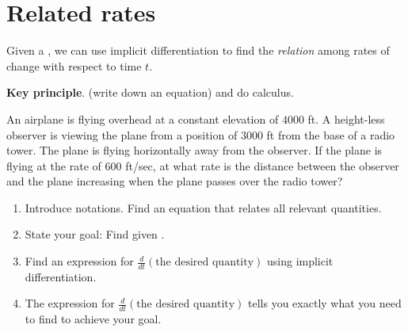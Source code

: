 \documentclass[../main.tex]{subfiles}
\begin{document}
 \section{Related rates} \label{lesson:related-rates}
Given a , we can use implicit differentiation  to find the \emph{relation} among rates of change with respect to time \(t\). 

\begin{mdframed}[style=simple-compact]
  \textbf{Key principle}.  (write down an equation) and do calculus. 
\end{mdframed}

\begin{example} \label{ex:related-rates-plane}
  An airplane is flying overhead at a constant elevation of \(4000\) ft. A height-less observer is viewing the plane from a position of \(3000\) ft from the base of a radio tower. The plane is flying horizontally away from the observer. If the plane is flying at the rate of \(600\) ft/sec, at what rate is the distance between the observer and the plane increasing when the plane passes over the radio tower?

  \begin{enumerate}[wide, label=(Step~\arabic*).]
    \item Introduce notations. Find an equation that relates all relevant quantities.


    \item State your goal: Find \underline{\hspace{1in}} given \underline{\hspace{3in}}.

    \item Find an expression for \(\frac{d}{dt}(\text{the desired quantity})\) using implicit differentiation.


    \item The expression for \(\frac{d}{dt}\left( \text{the desired quantity} \right)\) tells you exactly what you need to find to achieve your goal.

  \end{enumerate}
\end{example}
\clearpage
\end{document}
